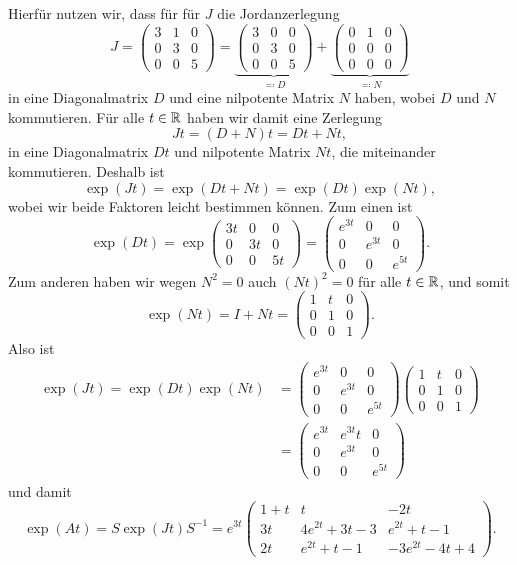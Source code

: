 \documentclass[a4paper, 10pt]{article}
\begin{document}
Hierfür nutzen wir, dass für für $J$ die Jordanzerlegung
\[
  J
  =
  \begin{pmatrix}
    3 & 1 & 0 \\
    0 & 3 & 0 \\
    0 & 0 & 5
  \end{pmatrix}
  =
  \underbrace{
  \begin{pmatrix}
    3 & 0 & 0 \\
    0 & 3 & 0 \\
    0 & 0 & 5
  \end{pmatrix}
  }_{\eqqcolon D}
  +
  \underbrace{
  \begin{pmatrix}
    0 & 1 & 0 \\
    0 & 0 & 0 \\
    0 & 0 & 0
  \end{pmatrix}
  }_{\eqqcolon N}
\]
in eine Diagonalmatrix $D$ und eine nilpotente Matrix $N$ haben, wobei $D$ und $N$ kommutieren.
Für alle $t \in \mathbb{R}$ haben wir damit eine Zerlegung
\[
  Jt
  = (D + N)t
  = Dt + Nt,
\]
in eine Diagonalmatrix $Dt$ und nilpotente Matrix $Nt$, die miteinander kommutieren.
Deshalb ist
\[
    \exp(Jt)
  = \exp(Dt + Nt)
  = \exp(Dt) \exp(Nt),
\]
wobei wir beide Faktoren leicht bestimmen können.
Zum einen ist
\[
  \exp(Dt)
  =
  \exp
  \begin{pmatrix}
    3t  & 0   & 0 \\
    0   & 3t  & 0 \\
    0   & 0   & 5t
  \end{pmatrix}
  =
  \begin{pmatrix}
    e^{3t}  & 0       & 0       \\
    0       & e^{3t}  & 0       \\
    0       & 0       & e^{5t}
  \end{pmatrix}.
\]
Zum anderen haben wir wegen $N^2 = 0$ auch $(Nt)^2 = 0$ für alle $t \in \mathbb{R}$, und somit
\[
  \exp(Nt)
  =
  I + Nt
  =
  \begin{pmatrix}
    1 & t & 0 \\
    0 & 1 & 0 \\
    0 & 0 & 1
  \end{pmatrix}.
\]
Also ist
\begin{align*}
      \exp(Jt)
   =  \exp(Dt) \exp(Nt)
  &=
  \begin{pmatrix}
    e^{3t}  & 0       & 0       \\
    0       & e^{3t}  & 0       \\
    0       & 0       & e^{5t}
  \end{pmatrix}
  \begin{pmatrix}
    1 & t & 0 \\
    0 & 1 & 0 \\
    0 & 0 & 1
  \end{pmatrix} \\
  &=
  \begin{pmatrix}
    e^{3t}  & e^{3t} t  & 0       \\
    0       & e^{3t}    & 0       \\
    0       & 0         & e^{5t}
  \end{pmatrix}
\end{align*}
und damit
\[
    \exp(At)
  = S \exp(Jt) S^{-1}
  =
  e^{3t}
  \begin{pmatrix}
    1 + t &              t      &           - 2 t     \\
       3t & 4 e^{2t} + 3 t - 3  &    e^{2t} +   t - 1 \\
       2t &   e^{2t} +   t - 1  & -3 e^{2t} - 4 t + 4
  \end{pmatrix}.
\]
\end{document}
